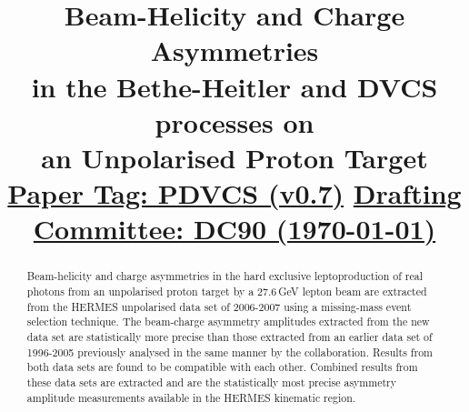 \documentclass{elsart}
\begin{document}
 \begin{frontmatter}

\title{
	Beam-Helicity and Charge Asymmetries \\
        in the Bethe-Heitler and DVCS processes on \\
        an Unpolarised Proton Target
  	\underline{Paper Tag: PDVCS (v0.7)}
        \underline{Drafting Committee: DC90 (\today)}
}

\begin{abstract}
Beam-helicity and charge asymmetries in the hard exclusive leptoproduction of
real photons from an unpolarised proton target by a 27.6\,GeV lepton beam 
are extracted from the HERMES unpolarised data set of 2006-2007 using a
missing-mass event selection technique. The beam-charge asymmetry amplitudes extracted from the new data set are statistically more precise than those extracted from an earlier data set of 1996-2005 previously analysed in the same manner by the collaboration. Results from both data sets are found to be compatible with each other. Combined results from these data sets are extracted and are the statistically most precise asymmetry amplitude measurements available in the HERMES kinematic region.
\end{abstract}

\end{frontmatter}
% 
\setvruler[15pt][1][1][3][1][30pt][30pt][-42pt]








\end{document}
